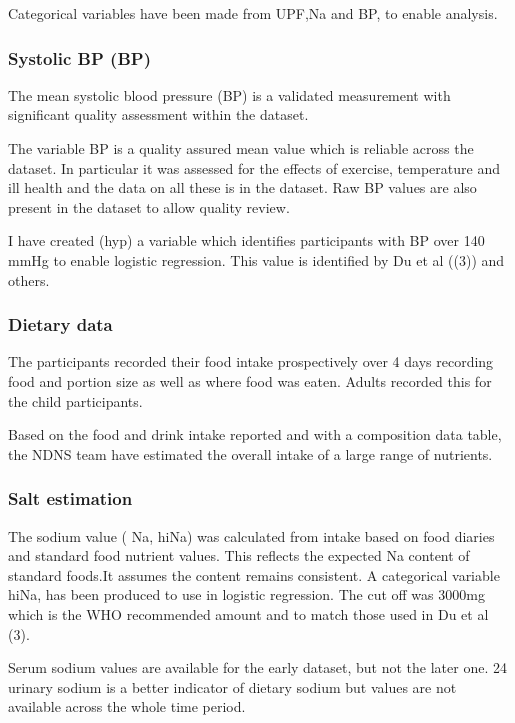 \documentclass[
]{article}
\begin{document}
Categorical variables have been made from UPF,Na and BP, to enable
analysis.

\hypertarget{systolic-bp-bp}{%
\subsubsection{Systolic BP (BP)}\label{systolic-bp-bp}}

The mean systolic blood pressure (BP) is a validated measurement with
significant quality assessment within the dataset.

The variable BP is a quality assured mean value which is reliable across
the dataset. In particular it was assessed for the effects of exercise,
temperature and ill health and the data on all these is in the dataset.
Raw BP values are also present in the dataset to allow quality review.

I have created (hyp) a variable which identifies participants with BP
over 140 mmHg to enable logistic regression. This value is identified by
Du et al ((3)) and others.

\hypertarget{dietary-data}{%
\subsubsection{Dietary data}\label{dietary-data}}

The participants recorded their food intake prospectively over 4 days
recording food and portion size as well as where food was eaten. Adults
recorded this for the child participants.

Based on the food and drink intake reported and with a composition data
table, the NDNS team have estimated the overall intake of a large range
of nutrients.

\hypertarget{salt-estimation}{%
\subsubsection{Salt estimation}\label{salt-estimation}}

The sodium value ( Na, hiNa) was calculated from intake based on food
diaries and standard food nutrient values. This reflects the expected Na
content of standard foods.It assumes the content remains consistent. A
categorical variable hiNa, has been produced to use in logistic
regression. The cut off was 3000mg which is the WHO recommended amount
and to match those used in Du et al (3).

Serum sodium values are available for the early dataset, but not the
later one. 24 urinary sodium is a better indicator of dietary sodium but
values are not available across the whole time period.
\end{document}
